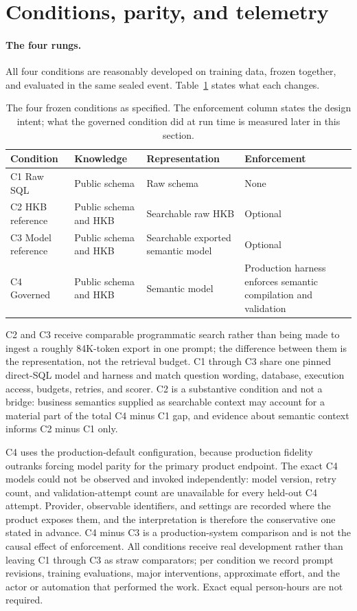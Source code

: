 \section{Conditions, parity, and telemetry}
\label{sec:conditions}

\paragraph{The four rungs.}
All four conditions are reasonably developed on training data, frozen together,
and evaluated in the same sealed event. Table~\ref{tab:conditions} states what
each changes.

\begin{table}[htbp]
\centering
\caption{The four frozen conditions as specified. The enforcement column states
the design intent; what the governed condition did at run time is measured later
in this section.}
\label{tab:conditions}
\begin{tabular}{p{2.3cm}p{3.1cm}p{3.6cm}p{3.6cm}}
\toprule
Condition & Knowledge & Representation & Enforcement \\
\midrule
C1 Raw SQL & Public schema & Raw schema & None \\
C2 HKB reference & Public schema and HKB & Searchable raw HKB & Optional \\
C3 Model reference & Public schema and HKB & Searchable exported semantic model & Optional \\
C4 Governed & Public schema and HKB & Semantic model & Production harness enforces semantic compilation and validation \\
\bottomrule
\end{tabular}
\end{table}

C2 and C3 receive comparable programmatic search rather than being made to ingest
a roughly 84K-token export in one prompt; the difference between them is the
representation, not the retrieval budget. C1 through C3 share one pinned
direct-SQL model and harness and match question wording, database, execution
access, budgets, retries, and scorer. C2 is a substantive condition and not a
bridge: business semantics supplied as searchable context may account for a
material part of the total C4 minus C1 gap, and evidence about semantic context
informs C2 minus C1 only.

C4 uses the production-default configuration, because production fidelity
outranks forcing model parity for the primary product endpoint. The exact C4
models could not be observed and invoked independently: model version, retry
count, and validation-attempt count are unavailable for every held-out C4
attempt. Provider, observable identifiers, and settings are recorded where the
product exposes them, and the interpretation is therefore the conservative one
stated in advance. C4 minus C3 is a production-system comparison and is not the
causal effect of enforcement. All conditions receive real
development rather than leaving C1 through C3 as straw comparators; per condition
we record prompt revisions, training evaluations, major interventions,
approximate effort, and the actor or automation that performed the work. Exact
equal person-hours are not required.

